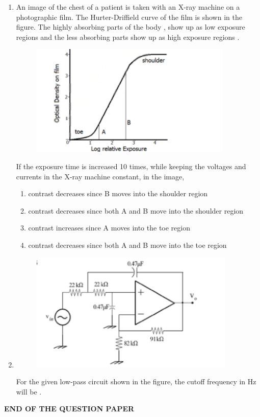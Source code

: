 \documentclass[journal,12pt,onecolumn]{IEEEtran}
\theoremstyle{remark}
\begin{document}
\begin{enumerate}
    \hfill{}

    
    
    \item An image of the chest of a patient is taken with an X-ray machine on a photographic film. The Hurter-Driffield  curve of the film is shown in the figure. The highly absorbing parts of the body , show up as low exposure regions  and the less absorbing parts  show up as high exposure regions .
    \begin{figure}[H]
        \centering
        \includegraphics[width=0.5\columnwidth]{q54}
        \caption*{}
        \label{Q54}
    \end{figure}
    If the exposure time is increased 10 times, while keeping the voltages and currents in the X-ray machine constant, in the image,

    \hfill{}
    \begin{enumerate}
        \item contrast decreases since B moves into the shoulder region
        \item contrast decreases since both A and B move into the shoulder region
        \item contrast increases since A moves into the toe region
        \item contrast decreases since both A and B move into the toe region
    \end{enumerate}

    

    \item
    \begin{figure}[H]
        \centering
        \includegraphics[width=0.6\columnwidth]{q55}
        \caption*{}
        \label{Q55}
    \end{figure}
    For the given low-pass circuit shown in the figure, the cutoff frequency in Hz will be \underline{\hspace{2cm}}.

    \hfill{}
    
\end{enumerate}

\begin{center}
    \textbf{END OF THE QUESTION PAPER}
\end{center}
\end{document}
